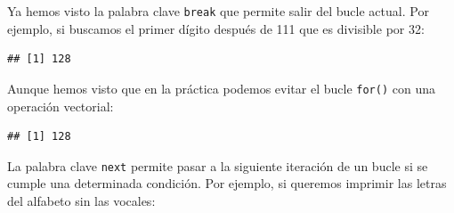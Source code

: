 \documentclass[
]{book}
\newenvironment{Shaded}{\begin{snugshade}}{\end{snugshade}}
\newcommand{\ControlFlowTok}[1]{\textcolor[rgb]{0.13,0.29,0.53}{\textbf{#1}}}
\newcommand{\DecValTok}[1]{\textcolor[rgb]{0.00,0.00,0.81}{#1}}
\newcommand{\KeywordTok}[1]{\textcolor[rgb]{0.13,0.29,0.53}{\textbf{#1}}}
\newcommand{\NormalTok}[1]{#1}
\newcommand{\OperatorTok}[1]{\textcolor[rgb]{0.81,0.36,0.00}{\textbf{#1}}}
\newcommand{\StringTok}[1]{\textcolor[rgb]{0.31,0.60,0.02}{#1}}
\begin{document}
Ya hemos visto la palabra clave \texttt{break} que permite salir del bucle actual. Por ejemplo, si buscamos el primer dígito después de 111 que es divisible por 32:

\begin{Shaded}
\end{Shaded}

\begin{verbatim}
## [1] 128
\end{verbatim}

Aunque hemos visto que en la práctica podemos evitar el bucle \texttt{for()} con una operación vectorial:

\begin{Shaded}
\end{Shaded}

\begin{verbatim}
## [1] 128
\end{verbatim}

La palabra clave \texttt{next} permite pasar a la siguiente iteración de un bucle si se cumple una determinada condición. Por ejemplo, si queremos imprimir las letras del alfabeto sin las vocales:

\begin{Shaded}
\end{Shaded}
\end{document}
